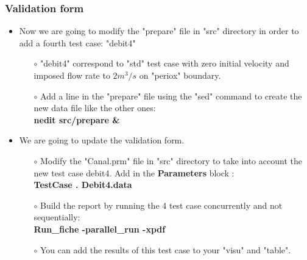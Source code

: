 \documentclass[10pt]{beamer}
\begin{document}
\begin{frame}
\frametitle{Validation form}
\begin{block}{}

\begin{itemize}
\item Now we are going to modify the "prepare" file in "src" directory in order to add a fourth test case: "debit4"
    \begin{itemize}
    \item [$\circ$] "debit4" correspond to "std" test case with zero initial velocity and imposed flow rate to $2 m^3/s$ on "periox" boundary.
    \item [$\circ$] Add a line in the "prepare" file using the "sed" command to create the new data file like the other ones:\\
    \textbf{nedit src/prepare \& }
    \end{itemize}

\item We are going to update the validation form.
    \begin{itemize}
    \item [$\circ$] Modify the "Canal.prm" file in "src" directory to take into account the new test case debit4. Add in the \textbf{Parameters} block :\\
    \hspace{0.3cm} \textbf{TestCase . Debit4.data}\\

    \item [$\circ$] Build the report by running the 4 test case concurrently and not sequentially:\\
    \textbf{Run\_fiche -parallel\_run -xpdf}
    \item [$\circ$] You can add the results of this test case to your "visu" and "table".
    \end{itemize}

\end{itemize}

\end{block}
\end{frame}
\end{document}
